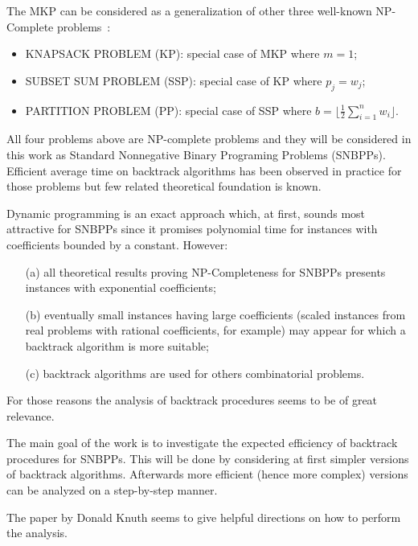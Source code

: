 \documentclass{article}
\begin{document}
The MKP can be considered as a generalization of other three well-known
NP-Comple\-te problems~\cite{garey1979}:
\begin{itemize}
  \item KNAPSACK PROBLEM (KP): special case of MKP where
$m = 1$;
  \item SUBSET SUM PROBLEM (SSP): special case of KP where
$p_j = w_j$;
  \item PARTITION PROBLEM (PP): special case of SSP where $b = \lfloor \frac{1}{2}\sum_{i=1}^n w_i \rfloor$.
\end{itemize}
All four problems above are NP-complete problems and they will be considered in
this work as Standard Nonnegative Binary Programing Problems (SNBPPs).
Efficient average time on backtrack algorithms has been observed in practice for
those problems but few related theoretical foundation is known.

Dynamic programming is an exact approach which, at first, sounds most attractive
for SNBPPs since it promises polynomial time for instances with
coefficients bounded by a constant. However:
\begin{enumerate}
  \item[(a)] all theoretical results proving NP-Completeness for SNBPPs pre\-sents
  instances with exponential coefficients;
  \item[(b)] eventually small instances having large coefficients
  (scaled instances from real problems with rational coefficients, for
  example) may appear for which a backtrack algorithm is more suitable;
  \item[(c)] backtrack algorithms are used for others combinatorial
  problems.
\end{enumerate}
For those reasons the analysis of backtrack procedures seems to be of great
relevance.

The main goal of the work is to investigate the expected efficiency of backtrack
procedures for SNBPPs.
This will be done by considering at first simpler versions of backtrack algorithms.
Afterwards more efficient (hence more complex) versions can be analyzed on a
step-by-step manner.

The paper by Donald Knuth \cite{knuth1975estimating} seems to give helpful
directions on how to perform the analysis.



\end{document}
